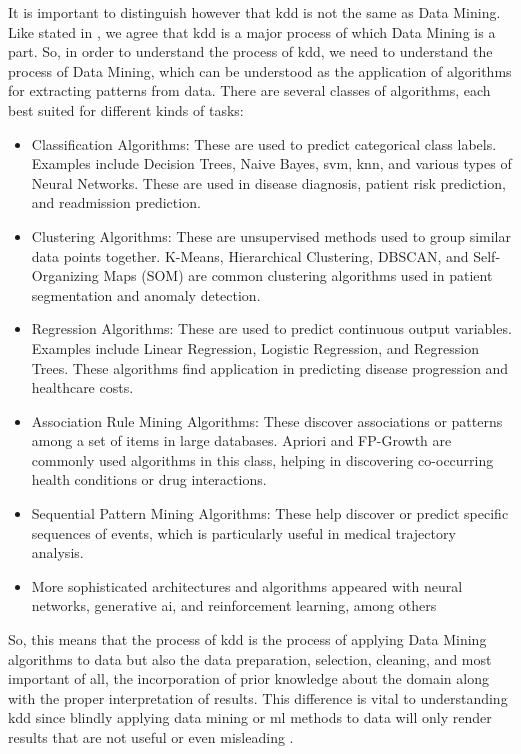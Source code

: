 It is important to distinguish however that \ac{kdd} is not the same as Data Mining. Like stated in \cite{Fayyad_Piatetsky-Shapiro_Smyth_1996}, we agree that \ac{kdd} is a major process of which Data Mining is a part. So, in order to understand the process of \ac{kdd}, we need to understand the process of Data Mining, which can be understood as the application of algorithms for extracting patterns from data. There are several classes of algorithms, each best suited for different kinds of tasks:
\begin{itemize}
    \item Classification Algorithms: These are used to predict categorical class labels. Examples include Decision Trees, Naive Bayes, \ac{svm}, \ac{knn}, and various types of Neural Networks. These are used in disease diagnosis, patient risk prediction, and readmission prediction.
\item Clustering Algorithms: These are unsupervised methods used to group similar data points together. K-Means, Hierarchical Clustering, DBSCAN, and Self-Organizing Maps (SOM) are common clustering algorithms used in patient segmentation and anomaly detection.

\item Regression Algorithms: These are used to predict continuous output variables. Examples include Linear Regression, Logistic Regression, and Regression Trees. These algorithms find application in predicting disease progression and healthcare costs.

\item Association Rule Mining Algorithms: These discover associations or patterns among a set of items in large databases. Apriori and FP-Growth are commonly used algorithms in this class, helping in discovering co-occurring health conditions or drug interactions.
\item Sequential Pattern Mining Algorithms: These help discover or predict specific sequences of events, which is particularly useful in medical trajectory analysis.

\item More sophisticated architectures and algorithms appeared with neural networks, generative \ac{ai}, and reinforcement learning, among others

\end{itemize}
So, this means that the process of \ac{kdd} is the process of applying Data Mining algorithms to data but also the data preparation, selection, cleaning, and most important of all, the incorporation of prior knowledge about the domain along with the proper interpretation of results. This difference is vital to understanding \ac{kdd} since blindly applying data mining or \ac{ml} methods to data will only render results that are not useful or even misleading \cite{Fayyad_Piatetsky-Shapiro_Smyth_1996}.

